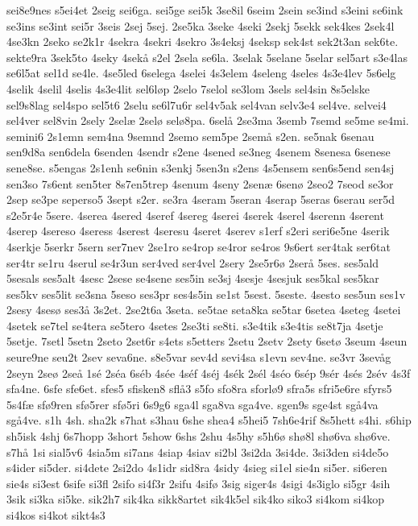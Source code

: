 {sei8e9nes
s5ei4et
2seig
sei6ga.
sei5ge
sei5k
3se8il
6seim
2sein
se3ind
s3eini
se6ink
se3ins
se3int
sei5r
3seis
2sej
5sej.
2se5ka
3seke
4seki
2sekj
5sekk
sek4kes
2sek4l
4se3kn
2seko
se2k1r
4sekra
4sekri
4sekro
3s4eksj
4seksp
sek4st
sek2t3an
sek6te.
sekte9ra
3sek5to
4seky
4sekå
s2el
2sela
se6la.
3selak
5selane
5selar
sel5art
s3e4las
se6l5at
sel1d
se4le.
4se5led
6selega
4selei
4s3elem
4seleng
4seles
4s3e4lev
5s6elg
4selik
4selil
4selis
4s3e4lit
sel6løp
2selo
7selol
se3lom
3sels
sel4sin
8s5elske
sel9s8lag
sel4spo
sel5t6
2selu
se6l7u6r
sel4v5ak
sel4van
selv3e4
sel4ve.
selvei4
sel4ver
sel8vin
2sely
2selæ
2selø
selø8pa.
6selå
2se3ma
3semb
7semd
se5me
se4mi.
semini6
2s1emn
sem4na
9semnd
2semo
sem5pe
2semå
s2en.
se5nak
6senau
sen9d8a
sen6dela
6senden
4sendr
s2ene
4sened
se3neg
4senem
8senesa
6senese
sene8se.
s5engas
2s1enh
se6nin
s3enkj
5sen3n
s2ens
4s5ensem
sen6s5end
sen4sj
sen3so
7s6ent
sen5ter
8s7en5trep
4senum
4seny
2senæ
6senø
2seo2
7seod
se3or
2sep
se3pe
seperso5
3sept
s2er.
se3ra
4seram
5seran
4serap
5seras
6serau
ser5d
s2e5r4e
5sere.
4serea
4sered
4seref
4sereg
4serei
4serek
4serel
4serenn
4serent
4serep
4sereso
4seress
4serest
4seresu
4seret
4serev
s1erf
s2eri
seri6e5ne
4serik
4serkje
5serkr
5sern
ser7nev
2se1ro
se4rop
se4ror
se4ros
9s6ert
ser4tak
ser6tat
ser4tr
se1ru
4serul
se4r3un
ser4ved
ser4vel
2sery
2se5r6ø
2serå
5ses.
ses5ald
5sesals
ses5alt
4sesc
2sese
se4sene
ses5in
se3sj
4sesje
4sesjuk
ses5kal
ses5kar
ses5kv
ses5lit
se3sna
5seso
ses3pr
ses4s5in
se1st
5sest.
5seste.
4sesto
ses5un
ses1v
2sesy
4sesø
ses3å
3s2et.
2se2t6a
3seta.
se5tae
seta8ka
se5tar
6setea
4seteg
4setei
4setek
se7tel
se4tera
se5tero
4setes
2se3ti
se8ti.
s3e4tik
s3e4tis
se8t7ja
4setje
5setje.
7setl
5setn
2seto
2set6r
s4ets
s5etters
2setu
2setv
2sety
6setø
3seum
4seun
seure9ne
seu2t
2sev
seva6ne.
s8e5var
sev4d
sevi4sa
s1evn
sev4ne.
se3vr
3sevåg
2seyn
2seø
2seå
1sé
2séa
6séb
4sée
4séf
4séj
4sék
2sél
4séo
6sép
9sér
4sés
2sév
4s3f
sfa4ne.
6sfe
sfe6et.
sfes5
sfisken8
sflå3
s5fo
sfo8ra
sforlø9
sfra5s
sfri5e6re
sfyrs5
5s4fæ
sfø9ren
sfø5rer
sfø5ri
6s9g6
sga4l
sga8va
sga4ve.
sgen9s
sge4st
sgå4va
sgå4ve.
s1h
4sh.
sha2k
s7hat
s3hau
6she
shea4
s5hei5
7sh6e4rif
8s5hett
s4hi.
s6hip
sh5isk
4shj
6s7hopp
3short
5show
6shs
2shu
4s5hy
s5h6ø
shø8l
shø6va
shø6ve.
s7hå
1si
sial5v6
4sia5m
si7ans
4siap
4siav
si2bl
3si2da
3si4de.
3si3den
si4de5o
s4ider
si5der.
si4dete
2si2do
4s1idr
sid8ra
4sidy
4sieg
si1el
sie4n
si5er.
si6eren
sie4s
si3est
6sife
si3fl
2sifo
si4f3r
2sifu
4sifø
3sig
siger4s
4sigi
4s3iglo
si5gr
4sih
3sik
si3ka
si5ke.
sik2h7
sik4ka
sikk8artet
sik4k5el
sik4ko
siko3
si4kom
si4kop
si4kos
si4kot
sikt4s3
}
